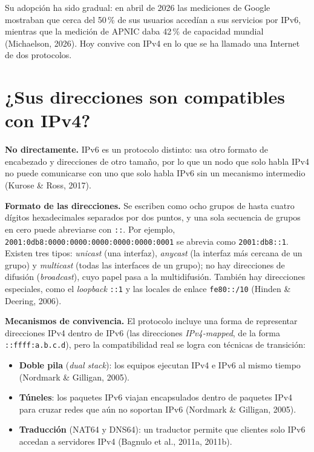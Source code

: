\documentclass[12pt,letterpaper]{article}
\begin{document}
Su adopción ha sido gradual: en abril de 2026 las mediciones de Google mostraban que cerca del 50\,\% de sus usuarios accedían a sus servicios por IPv6, mientras que la medición de APNIC daba 42\,\% de capacidad mundial (Michaelson, 2026). Hoy convive con IPv4 en lo que se ha llamado una Internet de dos protocolos.

\section{¿Sus direcciones son compatibles con IPv4?}
\textbf{No directamente.} IPv6 es un protocolo distinto: usa otro formato de encabezado y direcciones de otro tamaño, por lo que un nodo que solo habla IPv4 no puede comunicarse con uno que solo habla IPv6 sin un mecanismo intermedio (Kurose \& Ross, 2017).

\textbf{Formato de las direcciones.} Se escriben como ocho grupos de hasta cuatro dígitos hexadecimales separados por dos puntos, y una sola secuencia de grupos en cero puede abreviarse con \texttt{::}. Por ejemplo, \texttt{2001:0db8:0000:0000:0000:0000:0000:0001} se abrevia como \texttt{2001:db8::1}. Existen tres tipos: \emph{unicast} (una interfaz), \emph{anycast} (la interfaz más cercana de un grupo) y \emph{multicast} (todas las interfaces de un grupo); no hay direcciones de difusión (\emph{broadcast}), cuyo papel pasa a la multidifusión. También hay direcciones especiales, como el \emph{loopback} \texttt{::1} y las locales de enlace \texttt{fe80::/10} (Hinden \& Deering, 2006).

\textbf{Mecanismos de convivencia.} El protocolo incluye una forma de representar direcciones IPv4 dentro de IPv6 (las direcciones \emph{IPv4-mapped}, de la forma \texttt{::ffff:a.b.c.d}), pero la compatibilidad real se logra con técnicas de transición:
\begin{itemize}
\item \textbf{Doble pila} (\emph{dual stack}): los equipos ejecutan IPv4 e IPv6 al mismo tiempo (Nordmark \& Gilligan, 2005).
\item \textbf{Túneles}: los paquetes IPv6 viajan encapsulados dentro de paquetes IPv4 para cruzar redes que aún no soportan IPv6 (Nordmark \& Gilligan, 2005).
\item \textbf{Traducción} (NAT64 y DNS64): un traductor permite que clientes solo IPv6 accedan a servidores IPv4 (Bagnulo et al., 2011a, 2011b).
\end{itemize}
\end{document}
